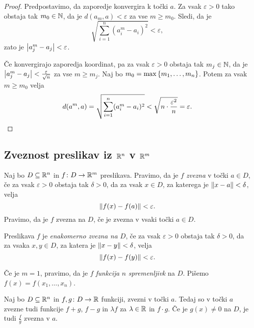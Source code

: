 \begin{proof}
Predpostavimo, da zaporedje konvergira k točki $a$. Za vsak
$\varepsilon>0$ tako obstaja tak $m_0 \in \mathbb{N}$, da je
$d(a_m,a) < \varepsilon$ za vse $m \geq m_0$. Sledi, da je
\[
\sqrt{\sum_{i=1}^n \left(a_i^m - a_i\right)^2} < \varepsilon,
\]
zato je $\left\lvert a_j^m - a_j\right\rvert < \varepsilon$.

Če konvergirajo zaporedja koordinat, pa za vsak $\varepsilon>0$
obstaja tak $m_j \in \mathbb{N}$, da je
$\left\lvert a_j^m - a_j\right\rvert < \frac{\varepsilon}{\sqrt{n}}$ za vse
$m \geq m_j$. Naj bo $m_0 = \max\left\{m_1, \dots, m_n\right\}$. Potem za
vsak $m \geq m_0$ velja
\[
d(a^m,a) = \sqrt{\sum_{i=1}^n (a_i^m - a_i)^2}
< \sqrt{n \cdot \frac{\varepsilon^2}{n}} = \varepsilon. \qedhere
\]
\end{proof}

\newpage

\subsection{Zveznost preslikav iz $\mathbb{R}^n$ v $\mathbb{R}^m$}

\begin{definicija}
Naj bo $D \subseteq \mathbb{R}^n$ in $f \colon D\to\mathbb{R}^m$ preslikava.
Pravimo, da je $f$ \emph{zvezna} v točki
$a\in D$, če za vsak $\varepsilon > 0$ obstaja tak $\delta > 0$, da
za vsak $x \in D$, za katerega je $\left\lVert x - a\right\rVert < \delta$, velja
\[
\left\lVert f(x) - f(a)\right\rVert < \varepsilon.
\]
Pravimo, da je $f$ zvezna na $D$, če je zvezna v vsaki točki
$a \in D$.
\end{definicija}

\begin{definicija}
Preslikava $f$ je \emph{enakomerno zvezna na $D$}, če za vsak $\varepsilon > 0$ obstaja tak
$\delta > 0$, da za vsaka $x,y \in D$, za katera je
$\left\lVert x - y\right\rVert < \delta$, velja
\[
\left\lVert f(x) - f(y)\right\rVert < \varepsilon.
\]
\end{definicija}

\begin{opomba}
Če je $m = 1$, pravimo, da je $f$
\emph{funkcija $n$ spremenljivk} na $D$. Pišemo $f(x) = f(x_1, \dots, x_n)$.
\end{opomba}

\begin{izrek}
Naj bo $D \subseteq \mathbb{R}^n$ in $f, g \colon D \to \mathbb{R}$ funkciji,
zvezni v točki $a$. Tedaj so v točki $a$ zvezne tudi funkcije
$f + g$, $f - g$ in $\lambda f$ za $\lambda \in \mathbb{R}$ in $f\cdot g$.
Če je $g(x) \ne 0$ na $D$, je tudi $\frac{f}{g}$ zvezna v $a$.
\end{izrek}


